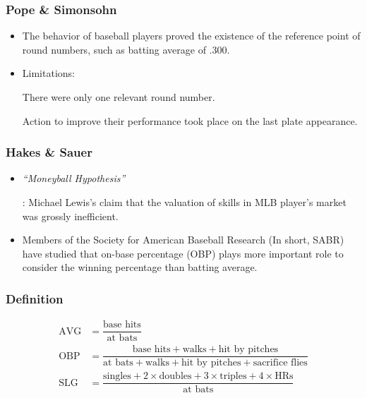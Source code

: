 \documentclass[dvipdfmx,12pt]{beamer}
\begin{document}
\begin{frame}\frametitle{Pope \& Simonsohn}

 \begin{itemize}
 
 \item The behavior of baseball players proved the existence of the reference point of round numbers, such as batting average of .300.
 
 \item Limitations:
 
 There were only one relevant round number.
 
 Action to improve their performance took place on the last plate appearance.
 
 \end{itemize}

\end{frame}

\begin{frame}\frametitle{Hakes \& Sauer}

 \begin{itemize}
 \item \textit{``Moneyball Hypothesis''}
 
 : Michael Lewis's claim that the valuation of skills in MLB player's market was grossly inefficient.
 
 \item Members of the Society for American Baseball Research (In short, SABR) have studied that
 on-base percentage (OBP) plays more important role to consider the winning percentage than batting average.
 
 \end{itemize}

\end{frame}

\begin{frame}\frametitle{Definition}

\begin{align*}
\text{AVG} &= \dfrac{\text{base hits}}{\text{at bats}} \\
\text{OBP} &= \dfrac{\text{base hits} + \text{walks} + \text{hit by pitches}} 
{\text{at bats} + \text{walks} + \text{hit by pitches} + \text{sacrifice flies}} \\
\text{SLG} &= \dfrac{\text{singles} + 2 \times \text{doubles} + 3 \times \text{triples} + 4 \times \text{HRs}}
{\text{at bats}}
\end{align*}

\end{frame}
\end{document}
